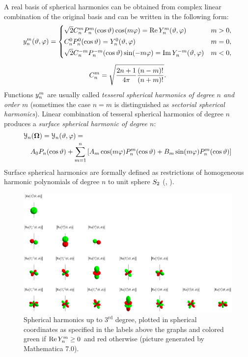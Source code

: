 A real basis of spherical harmonics can be obtained from complex linear combination of the original basis and can be
written in the following form:
\begin{gather*}
    y_{n}^{m}(\vartheta,\varphi) = 
    \begin{cases}
    	\sqrt{2} C_n^m P_{n}^{m}(\cos\vartheta)\cos(m \varphi) = \mathrm{Re}\,Y_{n}^{m}(\vartheta,\varphi) & m > 0,\\[.2em]
    	C_n^0 P_{n}^{0}(\cos\vartheta) = Y_{n}^{0}(\vartheta,\varphi) & m = 0,\\[.2em]
    	\sqrt{2} C_n^{-m} P_{n}^{-m}(\cos\vartheta)\sin(-m \varphi) = \mathrm{Im}\,Y_{n}^{-m}(\vartheta,\varphi) & m < 0,
    \end{cases}\\[.5em]
    C_n^m = \sqrt{\frac{2n+1}{4\pi}\frac{(n-m)!}{(n+m)!}}.   
\end{gather*}
Functions $y_{n}^{m}$ are usually called \textit{tesseral spherical harmonics of degree $n$ and order $m$} (sometimes the
case $n = m$ is distinguished as \textit{sectorial spherical harmonics}). Linear combination of tesseral spherical
harmonics of degree $n$ produces a \textit{surface spherical harmonic of degree $n$}:
\begin{equation*}
\begin{multlined}
    \mathcal{Y}_n(\bomega) = \mathcal{Y}_n(\polar,\azimuthal) = \\A_0 P_n(\cos\polar) + \suma[m]{1}{n}\left[ A_m
    \cos(m\azimuthal)\P{n}{m}(\cos\polar) + B_m \sin(m\azimuthal)\P{n}{m}(\cos\polar)\right]
  \end{multlined}
  \end{equation*}
Surface spherical harmonics are formally defined as restrictions of homogeneous harmonic polynomials of degree $n$ to
unit sphere $S_2$ (\cite[Art. 110]{Byerly}, \cite[Def. 3.22]{Schreiner}).

\newpage
\begin{figure}
	\centering
		\includegraphics[scale=1.2]{pic/sh.eps}
		\caption[Spherical harmonics]{Spherical harmonics up to $3^{\mbox{rd}}$ degree, plotted in spherical coordinates 
		as specified in the labels above the graphs and colored green if $\mathrm{Re}\,Y_{n}^{m} \geq 0$ and red
		otherwise (picture generated by Mathematica 7.0).}%
	\label{fig:SH} 
\end{figure}



